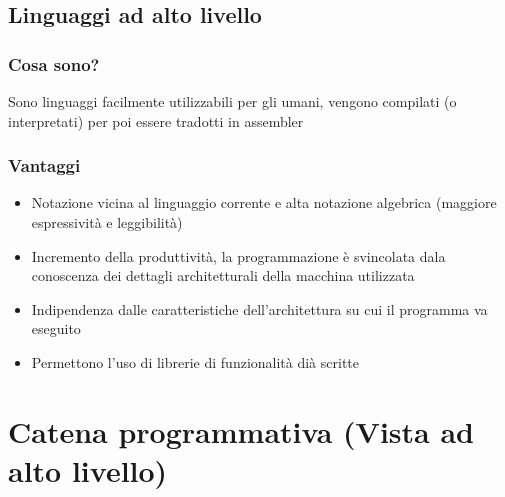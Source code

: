 \subsection{Linguaggi ad alto livello}
\subsubsection{Cosa sono?}
Sono linguaggi facilmente utilizzabili per gli umani, vengono compilati (o interpretati) per poi essere tradotti in assembler

\subsubsection{Vantaggi}
\begin{itemize}
    \item Notazione vicina al linguaggio corrente e alta notazione algebrica (maggiore espressività e leggibilità)
    \item Incremento della produttività, la programmazione è svincolata dala conoscenza dei dettagli architetturali della macchina utilizzata
    \item Indipendenza dalle caratteristiche dell'architettura su cui il programma va eseguito
    \item Permettono l'uso di librerie di funzionalità dià scritte
\end{itemize}

\section{Catena programmativa (Vista ad alto livello)}
